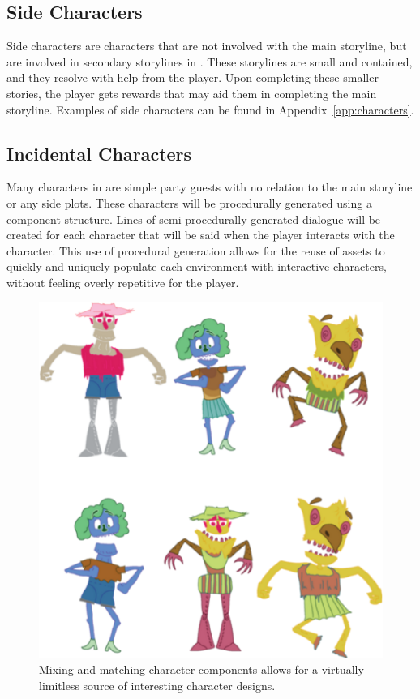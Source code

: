 \subsection{Side Characters}
Side characters are characters that are not involved with the main storyline, but are involved in secondary storylines in \ourgame{}. These storylines are small and contained, and they resolve with help from the player. Upon completing these smaller stories, the player gets rewards that may aid them in completing the main storyline. Examples of side characters can be found in Appendix~\ref{app:characters}.

\subsection{Incidental Characters}
Many characters in \ourgame{} are simple party guests with no relation to the main storyline or any side plots. These characters will be procedurally generated using a component structure. Lines of semi-procedurally generated dialogue will be created for each character that will be said when the player interacts with the character. This use of procedural generation allows for the reuse of assets to quickly and uniquely populate each environment with interactive characters, without feeling overly repetitive for the player.


\begin{figure}[htb]
\centering\includegraphics[width=.4\linewidth]{images/component_example}
\caption{Mixing and matching character components allows for a virtually limitless source of interesting character designs.}
\label{fig:component_example}
\end{figure}